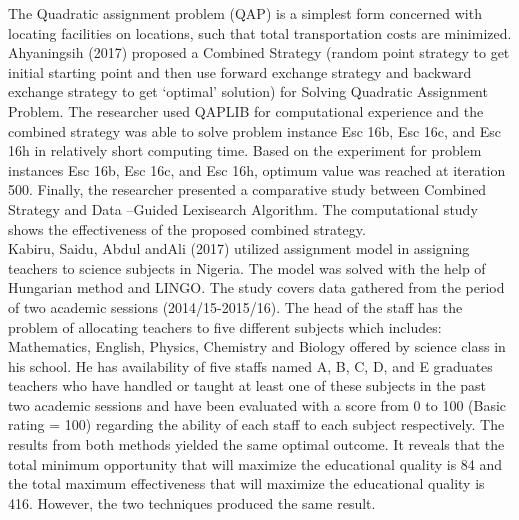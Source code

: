 \documentclass[11pt]{report}
\newcommand{\NI}{\noindent}
\begin{document}
	\NI The Quadratic assignment problem (QAP) is a simplest form concerned with locating facilities on locations, such that total transportation costs are minimized. Ahyaningsih (2017) proposed a Combined Strategy (random point strategy to get initial starting point and then use forward exchange strategy and backward exchange strategy to get ‘optimal’ solution) for Solving Quadratic Assignment Problem. The researcher used QAPLIB for computational experience and the combined strategy was able to solve problem instance Esc 16b, Esc 16c, and Esc 16h in relatively short computing time. Based on the experiment for problem instances Esc 16b, Esc 16c, and Esc
	16h, optimum value was reached at iteration 500. Finally, the researcher presented a comparative study between Combined Strategy and Data –Guided Lexisearch Algorithm. The computational study shows the effectiveness of the proposed combined strategy.\\
	
	\NI Kabiru, Saidu, Abdul andAli (2017) utilized assignment model in assigning teachers to science subjects in Nigeria. The model was solved with the help of Hungarian method and LINGO. The study covers data gathered from the period of two academic sessions (2014/15-2015/16). The head of the staff has the problem of allocating teachers to five different subjects which includes: Mathematics, English, Physics, Chemistry and Biology offered by science class in his school. He has availability of five staffs named A, B, C, D, and E graduates teachers who have handled or taught at least one of these subjects in the past two academic sessions and have been evaluated with a score from 0 to 100 (Basic rating = 100) regarding the ability of each staff to each subject
	respectively. The results from both methods yielded the same optimal outcome. It reveals that the total minimum opportunity that will maximize the educational quality is 84 and the total maximum effectiveness that will maximize the educational quality is 416. However, the two techniques
	produced the same result.\\
	
\end{document}

